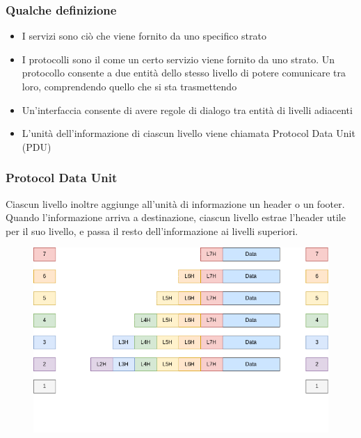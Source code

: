 \documentclass[aspectratio=169]{beamer}
\begin{document}
    \begin{frame}
        \frametitle{Qualche definizione}
        \begin{itemize}
            \item I servizi sono ciò che viene fornito da uno specifico strato
            \item I protocolli sono il come un certo servizio viene fornito da uno strato. Un protocollo consente a due entità dello stesso livello di potere comunicare tra loro, comprendendo quello che si sta trasmettendo
            \item Un'interfaccia consente di avere regole di dialogo tra entità di livelli adiacenti
            \item L'unità dell'informazione di ciascun livello viene chiamata Protocol Data Unit (PDU)
        \end{itemize}
    \end{frame}

    \begin{frame}
        \frametitle{Protocol Data Unit}
        Ciascun livello inoltre aggiunge all'unità di informazione un header o un footer. Quando l'informazione arriva a destinazione, ciascun livello estrae l'header utile per il suo livello, e passa il resto dell'informazione ai livelli superiori.
        \begin{figure}
            \centering
            \includegraphics[width=0.55\linewidth]{img/protocol-data-unit.png}
            \label{pdu}
        \end{figure}
    \end{frame}
    
\end{document}
